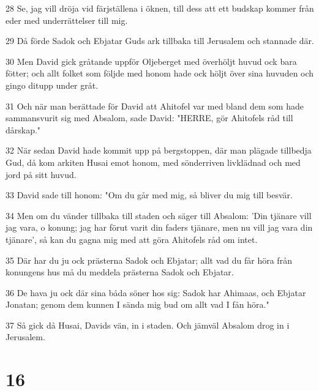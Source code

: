 \par 28 Se, jag vill dröja vid färjställena i öknen, till dess att ett budskap kommer från eder med underrättelser till mig.
\par 29 Då förde Sadok och Ebjatar Guds ark tillbaka till Jerusalem och stannade där.
\par 30 Men David gick gråtande uppför Oljeberget med överhöljt huvud ock bara fötter; och allt folket som följde med honom hade ock höljt över sina huvuden och gingo ditupp under gråt.
\par 31 Och när man berättade för David att Ahitofel var med bland dem som hade sammansvurit sig med Absalom, sade David: "HERRE, gör Ahitofels råd till dårskap."
\par 32 När sedan David hade kommit upp på bergstoppen, där man plägade tillbedja Gud, då kom arkiten Husai emot honom, med sönderriven livklädnad och med jord på sitt huvud.
\par 33 David sade till honom: "Om du går med mig, så bliver du mig till besvär.
\par 34 Men om du vänder tillbaka till staden och säger till Absalom: 'Din tjänare vill jag vara, o konung; jag har förut varit din faders tjänare, men nu vill jag vara din tjänare', så kan du gagna mig med att göra Ahitofels råd om intet.
\par 35 Där har du ju ock prästerna Sadok och Ebjatar; allt vad du får höra från konungens hus må du meddela prästerna Sadok och Ebjatar.
\par 36 De hava ju ock där sina båda söner hos sig: Sadok har Ahimaas, och Ebjatar Jonatan; genom dem kunnen I sända mig bud om allt vad I fån höra."
\par 37 Så gick då Husai, Davids vän, in i staden. Och jämväl Absalom drog in i Jerusalem.

\chapter{16}

